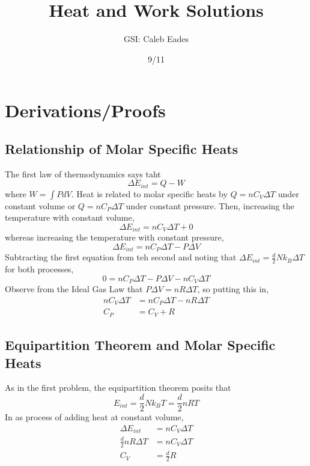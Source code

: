 \documentclass{article}
\begin{document}
	
\title{Heat and Work Solutions}
\author{GSI: Caleb Eades}
\date{9/11}
\maketitle

\section{Derivations/Proofs}

\subsection{Relationship of Molar Specific Heats}

The first law of thermodynamics says taht
\begin{equation}
\Delta E_{int} = Q-W
\end{equation}
where $W=\int PdV$. Heat is related to molar specific heats by $Q=nC_V\Delta T$ under constant volume or $Q=nC_P\Delta T$ under constant pressure. Then, increasing the temperature with constant volume,
\begin{equation}
\Delta E_{int} = nC_V\Delta T + 0
\end{equation}
whereas increasing the temperature with constant pressure,
\begin{equation}
\Delta E_{int} = nC_P\Delta T - P\Delta V
\end{equation}
Subtracting the first equation from teh second and noting that $\Delta E_{int} = \frac{d}{2}Nk_B\Delta T$ for both processes,
\begin{equation}
0 = nC_P\Delta T - P\Delta V - nC_V\Delta T
\end{equation}
Observe from the Ideal Gas Law that $P\Delta V = nR\Delta T$, so putting this in,
\begin{align*}
nC_V\Delta T &= nC_P\Delta T - nR\Delta T \\
C_P &= C_V + R
\end{align*}

\subsection{Equipartition Theorem and Molar Specific Heats}

As in the first problem, the equipartition theorem posits that
\begin{equation}
E_{int} = \frac{d}{2}Nk_B T = \frac{d}{2}nRT
\end{equation}
In as process of adding heat at constant volume,
\begin{align*}
\Delta E_{int} &= nC_V \Delta T \\
\frac{d}{2}nR\Delta T &= nC_V\Delta T \\
C_V &= \frac{d}{2}R
\end{align*}
\end{document}

